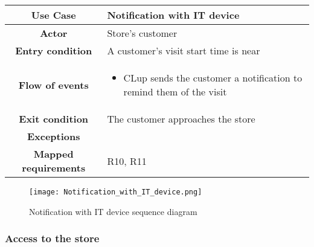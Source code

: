 \documentclass[../../main.tex]{subfiles}
\begin{document}
      \begin{table}[H]
        \centering
          \begin{tabular}{c m{}}
          \hline
          \textbf{Use Case} & Notification with IT device \\ \hline
          \textbf{Actor} & Store's customer\\ \hline
          \textbf{Entry condition} & A customer's visit start time is near\\  \hline
          \textbf{Flow of events} & \begin{itemize}
                                      \item CLup sends the customer a notification to remind them of the visit
                                    \end{itemize}\\ \hline
          \textbf{Exit condition} & The customer approaches the store \\ \hline
          \textbf{Exceptions} & \\ \hline
          \textbf{Mapped requirements} & R10, R11\\ \hline
          \end{tabular}
      \end{table}

      \begin{figure}[H]
        \centering
        \texttt{[image: Notification\_with\_IT\_device.png]}
        \caption{Notification with IT device sequence diagram}
      \end{figure}


      \subsubsection{Access to the store}
\end{document}
